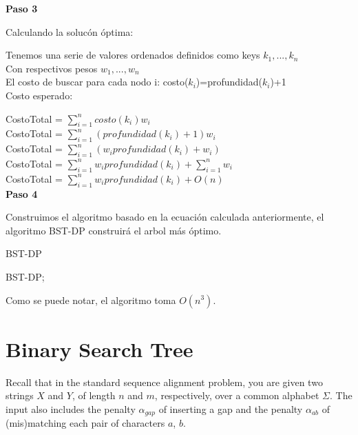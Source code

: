 \documentclass{article}
\begin{document}
\textbf{Paso 3}

Calculando la solucón óptima:

Tenemos una serie de valores ordenados definidos como keys $k_1, ..., k_n$\\
Con respectivos pesos $w_1, ..., w_n$\\
El costo de buscar para cada nodo i: costo($k_i$)=profundidad($k_i$)+1\\

Costo esperado: 

CostoTotal = $\sum_{i=1}^{n} costo(k_i) w_i$\\
CostoTotal = $\sum_{i=1}^{n} (profundidad(k_i)+1) w_i$\\
CostoTotal = $\sum_{i=1}^{n} (w_i profundidad(k_i)+w_i)$\\
CostoTotal = $\sum_{i=1}^{n} w_i profundidad(k_i) + \sum_{i=1}^{n} w_i$\\
CostoTotal = $\sum_{i=1}^{n} w_i profundidad(k_i) + O(n)$\\

\textbf{Paso 4}

Construimos el algoritmo basado en la ecuación calculada anteriormente, el algoritmo BST-DP construirá el arbol más óptimo.

\begin{algorithm}[H]
   \caption{BST-DP}
   BST-DP;\\
  \end{algorithm} 
  
  Como se puede notar, el algoritmo toma $O(n^3)$.


\section{Binary Search Tree}
Recall that in the standard sequence alignment problem, you are given two strings $X$ and $Y$, of length $n$ and $m$, respectively, over a common alphabet $\Sigma$. The input also includes the penalty $\alpha_{gap}$ of inserting a gap and the penalty $\alpha_{ab}$ of (mis)matching each pair of characters $a$, $b$.
\end{document}
